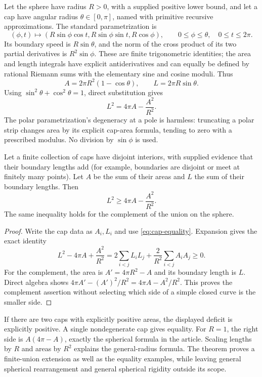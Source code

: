 Let the sphere have radius \(R>0\), with a supplied positive lower bound,
and let a cap have angular radius \(\theta\in[0,\pi]\), named with
primitive recursive approximations. The standard parametrization is
\[
 (\phi,t)\longmapsto
 (R\sin\phi\cos t,R\sin\phi\sin t,R\cos\phi),
 \qquad 0\leq\phi\leq\theta,\quad0\leq t\leq2\pi.
\]
Its boundary speed is \(R\sin\theta\), and the norm of the cross
product of its two partial derivatives is \(R^2\sin\phi\).
These are finite trigonometric identities; the area and length integrals
have explicit antiderivatives and can equally be defined by rational
Riemann sums with the elementary sine and cosine moduli. Thus
\[
 A=2\pi R^2(1-\cos\theta),\qquad
 L=2\pi R\sin\theta.
\]
Using \(\sin^2\theta+\cos^2\theta=1\), direct substitution gives
\begin{equation}\label{eq:cap-equality}
 L^2=4\pi A-\frac{A^2}{R^2}.
\end{equation}
The polar parametrization's degeneracy at a pole is harmless: truncating
a polar strip changes area by its explicit cap-area formula, tending to
zero with a prescribed modulus. No division by \(\sin\phi\) is used.

\begin{theorem}
Let a finite collection of caps have disjoint interiors, with supplied
evidence that their boundary lengths add (for example, boundaries are
disjoint or meet at finitely many points). Let \(A\) be the sum of their
areas and \(L\) the sum of their boundary lengths. Then
\[
 L^2\geq4\pi A-\frac{A^2}{R^2}.
\]
The same inequality holds for the complement of the union on the sphere.
\end{theorem}
\begin{proof}
Write the cap data as \(A_i,L_i\) and use
\eqref{eq:cap-equality}. Expansion gives the exact identity
\[
 L^2-4\pi A+\frac{A^2}{R^2}
 =2\sum_{i<j}L_iL_j+\frac2{R^2}\sum_{i<j}A_iA_j\geq0.
\]
For the complement, the area is \(A'=4\pi R^2-A\) and its boundary
length is \(L\). Direct algebra shows
\(4\pi A'-(A')^2/R^2=4\pi A-A^2/R^2\).
This proves the complement assertion without selecting which side of a
simple closed curve is the smaller side.
\end{proof}

If there are two caps with explicitly positive areas, the displayed
deficit is explicitly positive. A single nondegenerate cap gives equality.
For \(R=1\), the right side is \(A(4\pi-A)\), exactly the spherical
formula in the article. Scaling lengths by \(R\) and areas by \(R^2\)
explains the general-radius formula. The theorem proves a finite-union
extension as well as the equality examples, while leaving general
spherical rearrangement and general spherical rigidity outside its scope.

